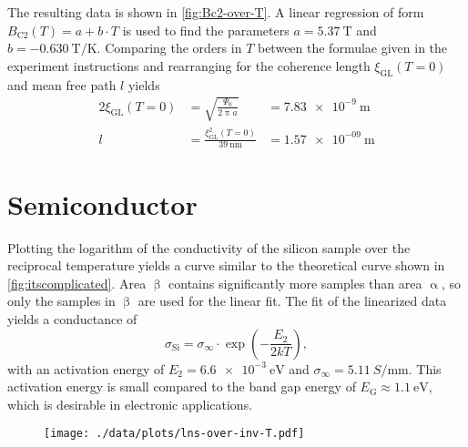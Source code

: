 The resulting data is shown in \autoref{fig:Bc2-over-T}.
A linear regression of form $B_\text{C2}(T) = a + b \cdot T$ is used to find the parameters $a = \SI{5.37}{\tesla}$ and $b = \SI{-0.630}{\tesla\per\kelvin}$.
Comparing the orders in $T$ between the formulae given in the experiment instructions and rearranging for the coherence length $\xi_\text{GL}(T = 0)$ and mean free path $l$ yields
\begin{alignat*}{2}
	\xi_\text{GL}(T = 0) &= \sqrt{\frac{\Psi_0}{2 \uppi a}} &= \SI{7.83e-9}{\meter}\\
	l &= \frac{\xi^2_\text{GL}(T = 0)}{\SI{39}{\nano\meter}} &= \SI{1.57e-09}{\meter}
\end{alignat*}

\section{Semiconductor}
Plotting the logarithm of the conductivity of the silicon sample over the reciprocal temperature yields a curve similar to the theoretical curve shown in \autoref{fig:itscomplicated}.
Area $\upbeta$ contains significantly more samples than area $\upalpha$, so only the samples in $\upbeta$ are used for the linear fit.
The fit of the linearized data yields a conductance of
\begin{equation*}
	\sigma_\text{Si} = \sigma_\infty \cdot \exp\left(- \frac{E_2}{2 k T}\right),
\end{equation*}
with an activation energy of $E_2 = \SI{6.6e-3}{\eV}$ and $\sigma_\infty = \SI{5.11}{S\per\milli\meter}$.
This activation energy is small compared to the band gap energy of $E_\text{G} \approx \SI{1.1}{\eV}$, which is desirable in electronic applications.

\begin{figure}
	\centering
	\texttt{[image: ./data/plots/lns-over-inv-T.pdf]}
	\label{fig:lns-over-inv-T}
\end{figure}
